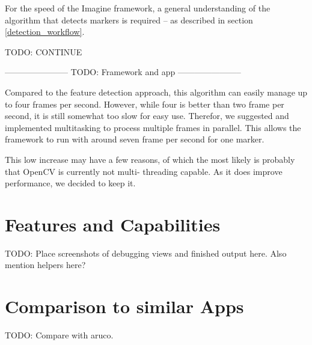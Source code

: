 For the speed of the Imagine framework, a general understanding of the algorithm that detects markers is required – as described in section \ref{detection_workflow}.

TODO: CONTINUE

----------------------- TODO: Framework and app -----------------------

Compared to the feature detection approach, this algorithm can easily manage up to four frames per second.
However, while four is better than two frame per second, it is still somewhat too slow for easy use.
Therefor, we suggested and implemented multitasking to process multiple frames in parallel.
This allows the framework to run with around seven frame per second for one marker.

This low increase may have a few reasons, of which the most likely is probably that OpenCV is currently not multi-
threading capable.
As it does improve performance, we decided to keep it.

\section{Features and Capabilities}

TODO: Place screenshots of debugging views and finished output here.
Also mention helpers here?

\section{Comparison to similar Apps}

TODO: Compare with aruco.
